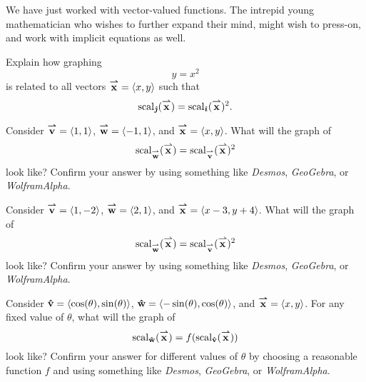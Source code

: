 \documentclass[handout,hints,noauthor,nooutcomes]{ximera}
\begin{document}
We have just worked with vector-valued functions. The intrepid young
mathematician who wishes to further expand their mind, might wish to
press-on, and work with implicit equations as well.


\begin{problem}
  Explain how graphing
  \[
  y= x^2
  \]
  is related to all vectors $\vec{x}= \vector{x,y}$ such that
  \[
  \scal_\vecj(\vec{x}) = \scal_\veci(\vec{x})^2.
  \]
\end{problem}

\begin{problem}
  Consider $\vec{v} = \vector{1,1}$, $\vec{w} = \vector{-1,1}$, and $\vec{x}
  = \vector{x,y}$. What will the graph of 
  \[
  \scal_\vec{w}(\vec{x}) = \scal_\vec{v}(\vec{x})^2
  \]
  look like? Confirm your answer by using something like
  \textit{Desmos}, \textit{GeoGebra}, or \textit{WolframAlpha}.
\end{problem}

\begin{problem}
  Consider $\vec{v} = \vector{1,-2}$, $\vec{w} = \vector{2,1}$, and $\vec{x}
  = \vector{x-3,y+4}$. What will the graph of 
  \[
  \scal_\vec{w}(\vec{x}) = \scal_\vec{v}(\vec{x})^2
  \]
  look like? Confirm your answer by using something like
  \textit{Desmos}, \textit{GeoGebra}, or \textit{WolframAlpha}.
\end{problem}

\begin{problem}
  Consider $\uvec{v} = \vector{\cos(\theta),\sin(\theta)}$, $\uvec{w} =
    \vector{-\sin(\theta),\cos(\theta)}$, and $\vec{x} =
    \vector{x,y}$. For any fixed value of $\theta$, what will the
    graph of
  \[
  \scal_\uvec{w}(\vec{x}) = f(\scal_\uvec{v}(\vec{x}))
  \]
  look like? Confirm your answer for different values of $\theta$ by
  choosing a reasonable function $f$ and using something like
  \textit{Desmos}, \textit{GeoGebra}, or \textit{WolframAlpha}.
\end{problem}
\end{document}
